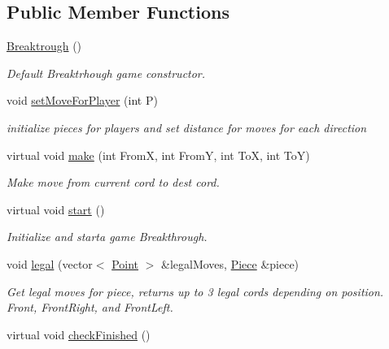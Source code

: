 \subsection*{Public Member Functions}
\begin{DoxyCompactItemize}
\item 
\hypertarget{class_breaktrough_a988083f0722bff1058a980748c65705f}{\hyperlink{class_breaktrough_a988083f0722bff1058a980748c65705f}{Breaktrough} ()}\label{class_breaktrough_a988083f0722bff1058a980748c65705f}

\begin{DoxyCompactList}\small\item\em Default Breaktrhough game constructor. \end{DoxyCompactList}\item 
void \hyperlink{class_breaktrough_a1e1244669a6ab63043329afcdaaeec37}{set\-Move\-For\-Player} (int P)
\begin{DoxyCompactList}\small\item\em initialize pieces for players and set distance for moves for each direction \end{DoxyCompactList}\item 
virtual void \hyperlink{class_breaktrough_a07006aa5d9919ddefa68554f3022afc6}{make} (int From\-X, int From\-Y, int To\-X, int To\-Y)
\begin{DoxyCompactList}\small\item\em Make move from current cord to dest cord. \end{DoxyCompactList}\item 
\hypertarget{class_breaktrough_a1e4b2c80e074f7052c4c491abe95c9f6}{virtual void \hyperlink{class_breaktrough_a1e4b2c80e074f7052c4c491abe95c9f6}{start} ()}\label{class_breaktrough_a1e4b2c80e074f7052c4c491abe95c9f6}

\begin{DoxyCompactList}\small\item\em Initialize and starta game Breakthrough. \end{DoxyCompactList}\item 
void \hyperlink{class_breaktrough_a6bf5d444ace61244df9a0255fde5d533}{legal} (vector$<$ \hyperlink{struct_point}{Point} $>$ \&legal\-Moves, \hyperlink{class_piece}{Piece} \&piece)
\begin{DoxyCompactList}\small\item\em Get legal moves for piece, returns up to 3 legal cords depending on position. Front, Front\-Right, and Front\-Left. \end{DoxyCompactList}\item 
\hypertarget{class_breaktrough_ae9e5edbac2c2fcce47711697eb3a8a2d}{virtual void \hyperlink{class_breaktrough_ae9e5edbac2c2fcce47711697eb3a8a2d}{check\-Finished} ()}\label{class_breaktrough_ae9e5edbac2c2fcce47711697eb3a8a2d}


\end{DoxyCompactItemize}
